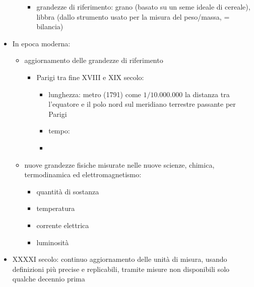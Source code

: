 \documentclass[letterpaper,10pt,italian]{jupyterBook}
\begin{document}
\begin{itemize}
\begin{itemize}
\begin{itemize}
\item {} 
\sphinxAtStartPar
grandezze di riferimento: grano (basato su un seme ideale di cereale), libbra (dallo strumento usato per la misura del peso/massa,  = bilancia)

\end{itemize}

\end{itemize}

\item {} 
\sphinxAtStartPar
In epoca moderna:
\begin{itemize}
\item {} 
\sphinxAtStartPar
aggiornamento delle grandezze di riferimento
\begin{itemize}
\item {} 
\sphinxAtStartPar
Parigi tra fine XVIII e XIX secolo:
\begin{itemize}
\item {} 
\sphinxAtStartPar
lunghezza: metro (1791) come \(1/10.000.000\) la distanza tra l’equatore e il polo nord sul meridiano terrestre passante per Parigi

\item {} 
\sphinxAtStartPar
tempo: 

\item {} 
\sphinxAtStartPar
{}

\end{itemize}

\end{itemize}

\item {} 
\sphinxAtStartPar
nuove grandezze fisiche misurate nelle nuove scienze, chimica, termodinamica ed elettromagnetismo:
\begin{itemize}
\item {} 
\sphinxAtStartPar
quantità di sostanza

\item {} 
\sphinxAtStartPar
temperatura

\item {} 
\sphinxAtStartPar
corrente elettrica

\item {} 
\sphinxAtStartPar
luminosità

\end{itemize}

\end{itemize}

\item {} 
\sphinxAtStartPar
XX\sphinxhyphen{}XXI secolo: continuo aggiornamento delle unità di misura, usando definizioni più precise e replicabili, tramite misure non disponibili solo qualche decennio prima

\end{itemize}
\end{document}
